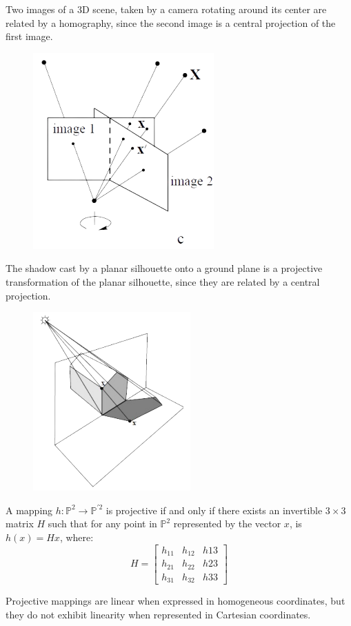 \documentclass[12pt, a4paper]{report}
\begin{document}
\begin{example}
\begin{figure}[H]
        \end{figure}
        Two images of a 3D scene, taken by a camera rotating around its center are related by a homography, since the second image is a central projection of the first image. 
        \begin{figure}[H]
            \centering
            \includegraphics[width=0.3\linewidth]{images/map4.png}
        \end{figure}
        The shadow cast by a planar silhouette onto a ground plane is a projective transformation of the planar silhouette, since they are related by a central projection. 
        \begin{figure}[H]
            \centering
            \includegraphics[width=0.3\linewidth]{images/map5.png}
        \end{figure}
    \end{example}
    \begin{theorem}
        A mapping $h:\mathbb{P}^{2} \rightarrow \mathbb{P}^{'2}$ is projective if and only if there exists an invertible $3 \times 3$ matrix $H$ such that for any point in $\mathbb{P}^{2}$ represented by the vector $x$, is $h(x)=Hx$, where: 
        \[H=\begin{bmatrix}
            h_{11} & h_{12} & h{13} \\
            h_{21} & h_{22} & h{23} \\
            h_{31} & h_{32} & h{33} 
        \end{bmatrix}\]
    \end{theorem}
    Projective mappings are linear when expressed in homogeneous coordinates, but they do not exhibit linearity when represented in Cartesian coordinates.
\end{document}
